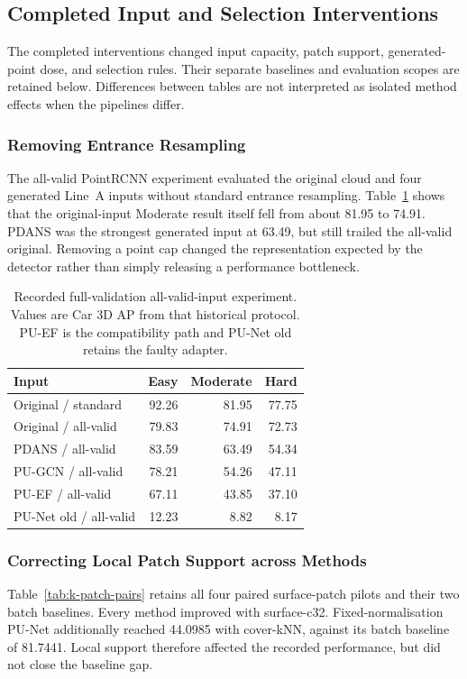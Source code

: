 \subsection{Completed Input and Selection Interventions}
\label{sec:kitti-interventions}
The completed interventions changed input capacity, patch support,
generated-point dose, and selection rules. Their separate baselines
and evaluation scopes are retained below. Differences between tables
are not interpreted as isolated method effects when the pipelines
differ.

\subsubsection{Removing Entrance Resampling}
The all-valid PointRCNN experiment evaluated the original cloud and
four generated Line~A inputs without standard entrance resampling.
Table~\ref{tab:k-all-valid} shows that the original-input Moderate
result itself fell from about 81.95 to 74.91. PDANS was the strongest
generated input at 63.49, but still trailed the all-valid original.
Removing a point cap changed the representation expected by the
detector rather than simply releasing a performance bottleneck.

\begin{table}[!t]\centering\setlength{\tabcolsep}{4pt}
\begin{tabular}{lrrr}\toprule
Input & Easy & Moderate & Hard\\\midrule
Original / standard & 92.26 & 81.95 & 77.75\\
Original / all-valid & 79.83 & 74.91 & 72.73\\
PDANS / all-valid & 83.59 & 63.49 & 54.34\\
PU-GCN / all-valid & 78.21 & 54.26 & 47.11\\
PU-EF / all-valid & 67.11 & 43.85 & 37.10\\
PU-Net old / all-valid & 12.23 & 8.82 & 8.17\\
\bottomrule\end{tabular}
\caption{Recorded full-validation all-valid-input experiment. Values are Car 3D AP from that historical protocol. PU-EF is the compatibility path and PU-Net old retains the faulty adapter.}\label{tab:k-all-valid}\end{table}

\subsubsection{Correcting Local Patch Support across Methods}
Table~\ref{tab:k-patch-pairs} retains all four paired surface-patch
pilots and their two batch baselines. Every method improved with
surface-c32. Fixed-normalisation PU-Net additionally reached 44.0985
with cover-kNN, against its batch baseline of 81.7441. Local support
therefore affected the recorded performance, but did not close the
baseline gap.

